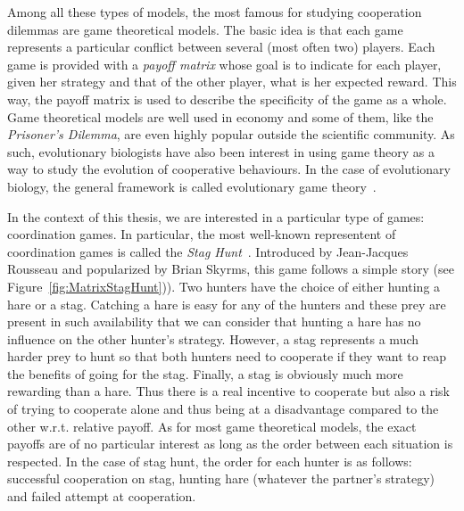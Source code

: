     Among all these types of models, the most famous for studying cooperation dilemmas are game theoretical models. The basic idea is that each game represents a particular conflict between several (most often two) players. Each game is provided with a \emph{payoff matrix} whose goal is to indicate for each player, given her strategy and that of the other player, what is her expected reward. This way, the payoff matrix is used to describe the specificity of the game as a whole. Game theoretical models are well used in economy and some of them, like the \emph{Prisoner's Dilemma}, are even highly popular outside the scientific community. As such, evolutionary biologists have also been interest in using game theory as a way to study the evolution of cooperative behaviours. In the case of evolutionary biology, the general framework is called evolutionary game theory~\parencite{MaynardSmith1973}.

    In the context of this thesis, we are interested in a particular type of games: coordination games. In particular, the most well-known representent of coordination games is called the \emph{Stag Hunt}~\parencite{Skyrms2004}. Introduced by Jean-Jacques Rousseau and popularized by Brian Skyrms, this game follows a simple story (see Figure~\ref{fig:MatrixStagHunt})). Two hunters have the choice of either hunting a hare or a stag. Catching a hare is easy for any of the hunters and these prey are present in such availability that we can consider that hunting a hare has no influence on the other hunter's strategy. However, a stag represents a much harder prey to hunt so that both hunters need to cooperate if they want to reap the benefits of going for the stag. Finally, a stag is obviously much more rewarding than a hare. Thus there is a real incentive to cooperate but also a risk of trying to cooperate alone and thus being at a disadvantage compared to the other w.r.t. relative payoff. As for most game theoretical models, the exact payoffs are of no particular interest as long as the order between each situation is respected. In the case of stag hunt, the order for each hunter is as follows: successful cooperation on stag, hunting hare (whatever the partner's strategy) and failed attempt at cooperation.

